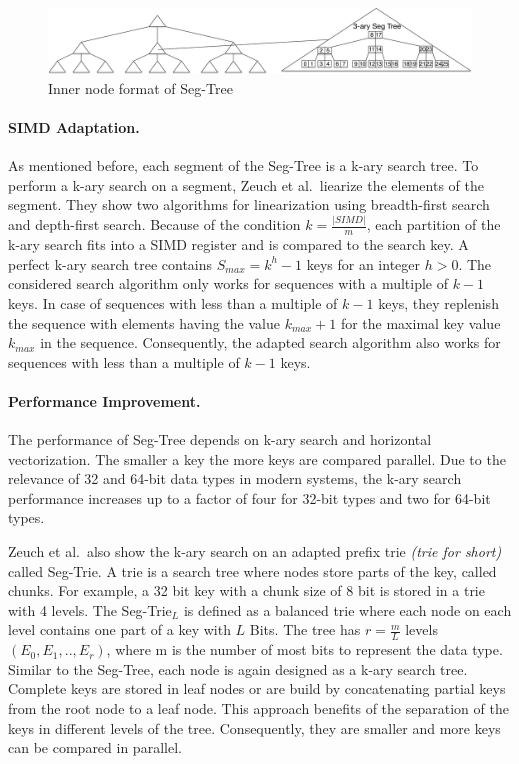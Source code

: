 \documentclass[runningheads,a4paper]{llncs}
\begin{document}
\begin{figure}
	\includegraphics[width=\textwidth]{SegTree}
	\caption{Inner node format of Seg-Tree}
	\label{seg}
\end{figure}

\paragraph{SIMD Adaptation.}
As mentioned before, each segment of the Seg-Tree is a k-ary search tree. To perform a k-ary search on a segment, Zeuch et al.\ liearize the elements of the segment. They show two algorithms for linearization using breadth-first search and depth-first search. Because of the condition $k = \frac{\vert SIMD \vert }{m}$, each partition of the k-ary search fits into a SIMD register and is compared to the search key. A perfect k-ary search tree contains  $S_{max} = k^h - 1$ keys for an integer $h > 0$. The considered search algorithm only works for sequences with a multiple of $k-1$ keys. In case of  sequences with less than a multiple of $k-1$ keys, they replenish the sequence with elements having the value $k_{max} + 1$ for the maximal key value $k_{max}$ in the sequence. Consequently, the adapted search algorithm also works for sequences with less than a multiple of $k-1$ keys.

\paragraph{Performance Improvement.}
The performance of Seg-Tree depends on k-ary search and horizontal vectorization. The smaller a key the more keys are compared parallel. Due to the relevance of 32 and 64-bit data types in modern systems, the k-ary search performance increases up to a factor of four for 32-bit types and two for 64-bit types.

Zeuch et al.\ also show the k-ary search on an adapted prefix trie \emph{(trie for short)} called Seg-Trie. A trie is a search tree where nodes store parts of the key, called chunks. For example, a 32 bit key with a chunk size of 8 bit is stored in a trie with 4 levels. The Seg-Trie$_L$ is defined as a balanced trie where each node on each level contains one part of a key with $L$ Bits. The tree has $r = \frac{m}{L}$ levels $(E_0, E_1, .., E_r)$, where m is the number of most bits to represent the data type. 
Similar to the Seg-Tree, each node is again designed as a k-ary search tree. Complete keys are stored in leaf nodes or are build by concatenating partial keys from the root node to a leaf node. This approach benefits of the separation of the keys in different levels of the tree. Consequently, they are smaller and more keys can be compared in parallel. 
\end{document}
